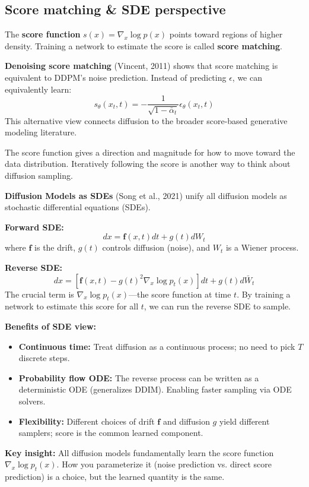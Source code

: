 \subsection{Score matching \& SDE perspective}

\begin{paperbox}[title={Score Function \& Score Matching}]
The \textbf{score function} $s(x) = \nabla_x \log p(x)$ points toward regions of higher density. Training a network to estimate the score is called \textbf{score matching}.

\textbf{Denoising score matching} (Vincent, 2011) shows that score matching is equivalent to DDPM's noise prediction. Instead of predicting $\epsilon$, we can equivalently learn:
\[
s_\theta(x_t, t) = -\frac{1}{\sqrt{1-\bar{\alpha}_t}} \epsilon_\theta(x_t, t)
\]
This alternative view connects diffusion to the broader score-based generative modeling literature.

\begin{intuitionbox}
The score function gives a direction and magnitude for how to move toward the data distribution. Iteratively following the score is another way to think about diffusion sampling.
\end{intuitionbox}
\end{paperbox}

\begin{paperbox}[title={SDE Perspective: Unifying Diffusion Models}]
\textbf{Diffusion Models as SDEs} (Song et al., 2021) unify all diffusion models as stochastic differential equations (SDEs).

\textbf{Forward SDE:}
\[
dx = \mathbf{f}(x, t) dt + g(t) dW_t
\]
where $\mathbf{f}$ is the drift, $g(t)$ controls diffusion (noise), and $W_t$ is a Wiener process.

\textbf{Reverse SDE:}
\[
dx = \left[\mathbf{f}(x, t) - g(t)^2 \nabla_x \log p_t(x)\right] dt + g(t) d\bar{W}_t
\]
The crucial term is $\nabla_x \log p_t(x)$—the score function at time $t$. By training a network to estimate this score for all $t$, we can run the reverse SDE to sample.

\textbf{Benefits of SDE view:}
\begin{itemize}
  \item \textbf{Continuous time:} Treat diffusion as a continuous process; no need to pick $T$ discrete steps.
  \item \textbf{Probability flow ODE:} The reverse process can be written as a deterministic ODE (generalizes DDIM). Enabling faster sampling via ODE solvers.
  \item \textbf{Flexibility:} Different choices of drift $\mathbf{f}$ and diffusion $g$ yield different samplers; score is the common learned component.
\end{itemize}

\begin{notebox}
\textbf{Key insight:} All diffusion models fundamentally learn the score function $\nabla_x \log p_t(x)$. How you parameterize it (noise prediction vs. direct score prediction) is a choice, but the learned quantity is the same.
\end{notebox}
\end{paperbox}



